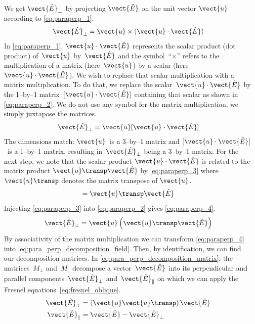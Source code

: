 We get $\vect{\hat{E}}_\perp$ by projecting $\vect{\hat{E}}$ on the unit vector $\vect{u}$ according to \cref{eq:paraperp_1}.
\begin{equation}
    \vect{\hat{E}}_\perp = \vect{u} \times (\vect{u} \cdot \vect{\hat{E}}) \label{eq:paraperp_1}
\end{equation}
In \cref{eq:paraperp_1}, $\vect{u} \cdot \vect{\hat{E}}$ represents the scalar product (dot product) of~$\vect{u}$ by~$\vect{\hat{E}}$ and the symbol~``$\times$'' refers to the multiplication of a matrix (here~$\vect{u}$) by a scalar (here~$\vect{u} \cdot \vect{\hat{E}}$).
We wish to replace that scalar multiplication with a matrix multiplication.
To do that, we replace the scalar~$\vect{u} \cdot \vect{\hat{E}}$ by the 1--by--1 matrix~$[\vect{u} \cdot \vect{\hat{E}}]$ containing that scalar as shown in \cref{eq:paraperp_2}.
We do not use any symbol for the matrix multiplication, we simply juxtapose the matrices.
\begin{equation}
    \vect{\hat{E}}_\perp = \vect{u} [\vect{u} \cdot \vect{\hat{E}}] \label{eq:paraperp_2}
\end{equation}
The dimensions match: $\vect{u}$~is a 3--by--1 matrix and $[\vect{u} \cdot \vect{\hat{E}}]$~is a 1--by--1 matrix, resulting in~$\vect{\hat{E}}_\perp$ being a 3--by--1 matrix.
For the next step, we note that the scalar product $\vect{u} \cdot \vect{\hat{E}}$ is related to the matrix product $\vect{u}\transp \vect{\hat{E}}$ by \cref{eq:paraperp_3} where $\vect{u}\transp$ denotes the matrix transpose of $\vect{u}$.
\begin{equation}
    [\vect{u} \cdot \vect{\hat{E}}] = \vect{u}\transp \vect{\hat{E}} \label{eq:paraperp_3}
\end{equation}
Injecting \cref{eq:paraperp_3} into \cref{eq:paraperp_2} gives \cref{eq:paraperp_4}.
\begin{equation}
    \vect{\hat{E}}_\perp = \vect{u} \left( \vect{u}\transp \vect{\hat{E}} \right) \label{eq:paraperp_4}
\end{equation}
By associativity of the matrix multiplication we can transform \cref{eq:paraperp_4} into \cref{eq:para_perp_decomposition_field}.
Then, by identification, we can find our decomposition matrices.
In \cref{eq:para_perp_decomposition_matrix}, the matrices~$M_\perp$ and~$M_\parallel$ decompose a vector~$\vect{\hat{E}}$ into its perpendicular and parallel components~$\vect{\hat{E}}_\perp$ and~$\vect{\hat{E}}_\parallel$ on which we can apply the Fresnel equations~\eqref{eq:fresnel_oblique}.
\begin{subequations}
    \label{eq:para_perp_decomposition_field}
    \begin{align}
        \vect{\hat{E}}_\perp &= \left(\vect{u} \vect{u}\transp \right) \vect{\hat{E}}
        \\
        \vect{\hat{E}}_\parallel &= \vect{\hat{E}} - \vect{\hat{E}}_\perp
    \end{align}
\end{subequations}
